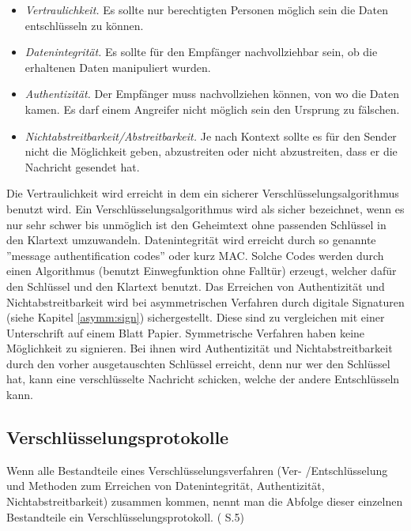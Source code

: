 \documentclass[a4paper,12pt,titlepage]{article}
\begin{document}
\begin{itemize}
\item \textit{Vertraulichkeit.} Es sollte nur berechtigten Personen möglich sein die Daten entschlüsseln zu können.

\item \textit{Datenintegrität.} Es sollte für den Empfänger nachvollziehbar sein, ob die erhaltenen Daten manipuliert wurden.

\item \textit{Authentizität.} Der Empfänger muss nachvollziehen können, von wo die Daten kamen. Es darf einem Angreifer nicht möglich sein den Ursprung zu fälschen.

\item \textit{Nichtabstreitbarkeit/Abstreitbarkeit.} Je nach Kontext sollte es für den Sender nicht die Möglichkeit geben, abzustreiten oder nicht abzustreiten, dass er die Nachricht gesendet hat.
\end{itemize} %
Die Vertraulichkeit wird erreicht in dem ein sicherer Verschlüsselungsalgorithmus benutzt wird. Ein Verschlüsselungsalgorithmus wird als sicher bezeichnet, wenn es nur sehr schwer bis unmöglich ist den Geheimtext ohne passenden Schlüssel in den Klartext umzuwandeln. Datenintegrität wird erreicht durch so genannte ''message authentification codes'' oder kurz MAC. Solche Codes werden durch einen Algorithmus (benutzt Einwegfunktion ohne Falltür) erzeugt, welcher dafür den Schlüssel und den Klartext benutzt. Das Erreichen von Authentizität und Nichtabstreitbarkeit wird bei asymmetrischen Verfahren durch digitale Signaturen (siehe Kapitel \ref{asymm:sign}) sichergestellt. Diese sind zu vergleichen mit einer Unterschrift auf einem Blatt Papier. Symmetrische Verfahren haben keine Möglichkeit zu signieren. Bei ihnen wird Authentizität und Nichtabstreitbarkeit durch den vorher ausgetauschten Schlüssel erreicht, denn nur wer den Schlüssel hat, kann eine verschlüsselte Nachricht schicken, welche der andere Entschlüsseln kann. 

\subsection{Verschlüsselungsprotokolle}
Wenn alle Bestandteile eines Verschlüsselungsverfahren (Ver- /Entschlüsselung und Methoden zum Erreichen von Datenintegrität, Authentizität, Nichtabstreitbarkeit) zusammen kommen, nennt man die Abfolge dieser einzelnen Bestandteile ein Verschlüsselungsprotokoll. (\cite{delfs_knebl} S.5)
\end{document}
